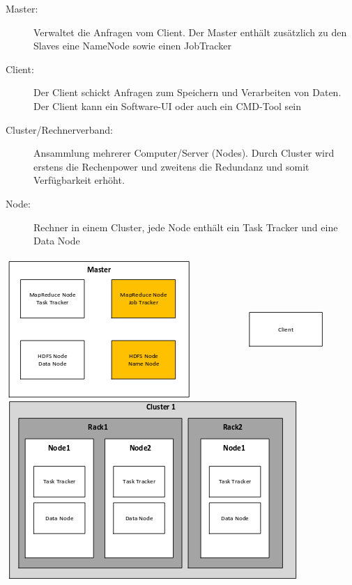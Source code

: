 \documentclass[a4paper, 11pt, nofootinbib]{article}
\begin{document}
\begin{minipage}[L]{0.45\textwidth}
	\begin{description}
		\item[Master: ] Verwaltet die Anfragen vom Client. Der Master enthält zusätzlich zu den Slaves eine NameNode sowie einen JobTracker
		\item[Client: ] Der Client schickt Anfragen zum Speichern und Verarbeiten von Daten. Der Client kann ein Software-UI oder auch ein CMD-Tool sein
		\item[Cluster/Rechnerverband: ] Ansammlung mehrerer Computer/Server (Nodes). Durch Cluster wird erstens die Rechenpower und zweitens die Redundanz und somit Verfügbarkeit erhöht.
		\item[Node: ] Rechner in einem Cluster, jede Node enthält ein Task Tracker und eine Data Node
	\end{description}
\end{minipage}
\begin{minipage}[R]{0.45\textwidth}
	\begin{center}
		\includegraphics[height=15\baselineskip, keepaspectratio=true]{hadoop_architektur_2.png}
	\end{center}
\end{minipage}
\end{document}

